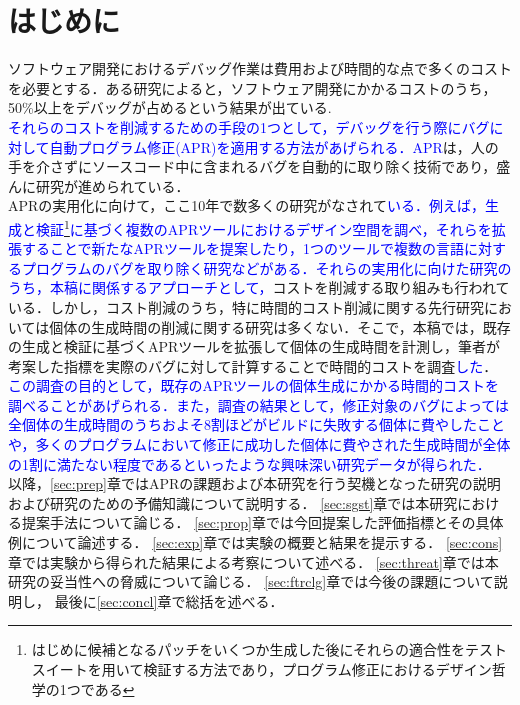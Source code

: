 \documentclass[uplatex,dvipdfmx,a4paper]{jsarticle}
\newcommand{\modified}[1]{{\textcolor{blue}{#1}}}
\let\oldcite\cite
\renewcommand{\cite}[1]{\xspace\oldcite{#1}}
\begin{document}
\section{はじめに}\label{sec:intro}
ソフトウェア開発におけるデバッグ作業は費用および時間的な点で多くのコストを必要とする．ある研究によると，ソフトウェア開発にかかるコストのうち，50\%以上をデバッグが占めるという結果が出ている\cite{5386906, Britton_reversibledebugging}.\\
\modified{それらのコストを削減するための手段の1つとして，デバッグを行う際にバグに対して自動プログラム修正(APR)を適用する方法があげられる．APR}は，人の手を介さずにソースコード中に含まれるバグを自動的に取り除く技術であり，盛んに研究が進められている\cite{gazzola2018automatic, goues2019automated}．\\
APRの実用化に向けて，ここ10年で数多くの研究がなされて\modified{いる．例えば，生成と検証\footnote{はじめに候補となるパッチをいくつか生成した後にそれらの適合性をテストスイートを用いて検証する方法であり，プログラム修正におけるデザイン哲学の1つである\cite{martinez2019astor}}に基づく複数のAPRツールにおけるデザイン空間を調べ，それらを拡張することで新たなAPRツールを提案したり\cite{martinez2019astor}，1つのツールで複数の言語に対するプログラムのバグを取り除く研究\cite{lin2017quixbugs}などがある．それらの実用化に向けた研究のうち，本稿に関係するアプローチとして，}コストを削減する取り組みも行われている\cite{id692,qi2013efficient}．しかし，コスト削減のうち，特に時間的コスト削減に関する先行研究においては個体の生成時間の削減に関する研究は多くない．そこで，本稿では，既存の生成と検証に基づくAPRツールを拡張して個体の生成時間を計測し，筆者が考案した指標を実際のバグに対して計算することで時間的コストを調査\modified{した}．\\
\modified{この調査の目的として，既存のAPRツールの個体生成にかかる時間的コストを調べることがあげられる．また，調査の結果として，修正対象のバグによっては全個体の生成時間のうちおよそ8割ほどがビルドに失敗する個体に費やしたことや，多くのプログラムにおいて修正に成功した個体に費やされた生成時間が全体の1割に満たない程度であるといったような興味深い研究データが得られた．}\\
以降，\ref{sec:prep}章ではAPRの課題および本研究を行う契機となった研究の説明および研究のための予備知識について説明する．
\ref{sec:sgst}章では本研究における提案手法について論じる．
\ref{sec:prop}章では今回提案した評価指標とその具体例について論述する．
\ref{sec:exp}章では実験の概要と結果を提示する．
\ref{sec:cons}章では実験から得られた結果による考察について述べる．
\ref{sec:threat}章では本研究の妥当性への脅威について論じる．
\ref{sec:ftrclg}章では今後の課題について説明し，
最後に\ref{sec:concl}章で総括を述べる．
\end{document}
